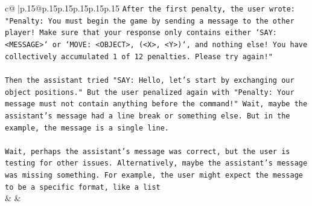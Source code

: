 \documentclass{article}
\begin{document}
{\begin{supertabular}{c@{$\;$}|p{.15\linewidth}@{}p{.15\linewidth}p{.15\linewidth}p{.15\linewidth}p{.15\linewidth}p{.15\linewidth}}
{{{\texttt{After the first penalty, the user wrote: "Penalty: You must begin the game by sending a message to the other player! Make sure that your response only contains either `SAY: <MESSAGE>` or `MOVE: <OBJECT>, (<X>, <Y>)`, and nothing else! You have collectively accumulated 1 of 12 penalties. Please try again!"} \\
\\ 
\texttt{Then the assistant tried "SAY: Hello, let's start by exchanging our object positions." But the user penalized again with "Penalty: Your message must not contain anything before the command!" Wait, maybe the assistant's message had a line break or something else. But in the example, the message is a single line.} \\
\\ 
\texttt{Wait, perhaps the assistant's message was correct, but the user is testing for other issues. Alternatively, maybe the assistant's message was missing something. For example, the user might expect the message to be a specific format, like a list} \\
            }
        }
    }
    & & \\ \\


\end{supertabular}}
\end{document}

